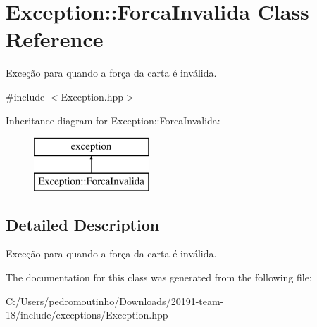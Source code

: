 \hypertarget{class_exception_1_1_forca_invalida}{}\section{Exception\+::Forca\+Invalida Class Reference}
\label{class_exception_1_1_forca_invalida}


Exceção para quando a força da carta é inválida.  




{\ttfamily \#include $<$Exception.\+hpp$>$}

Inheritance diagram for Exception\+::Forca\+Invalida\+:\begin{figure}[H]
\begin{center}
\leavevmode
\includegraphics[height=2.000000cm]{class_exception_1_1_forca_invalida}
\end{center}
\end{figure}


\subsection{Detailed Description}
Exceção para quando a força da carta é inválida. 



The documentation for this class was generated from the following file\+:\begin{DoxyCompactItemize}
\item 
C\+:/\+Users/pedromoutinho/\+Downloads/20191-\/team-\/18/include/exceptions/Exception.\+hpp\end{DoxyCompactItemize}
